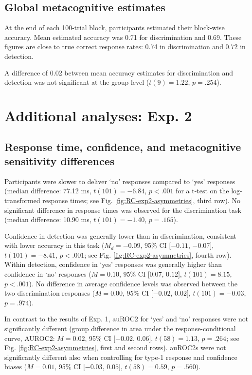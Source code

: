 \documentclass[12pt,twoside]{reedthesis}
\begin{document}
\hypertarget{global-metacognitive-estimates}{%
\subsection{Global metacognitive estimates}\label{global-metacognitive-estimates}}

At the end of each 100-trial block, participants estimated their block-wise accuracy. Mean estimated accuracy was 0.71 for discrimination and 0.69. These figures are close to true correct response rates: 0.74 in discrimination and 0.72 in detection.

A difference of 0.02 between mean accuracy estimates for discrimination and detection was not significant at the group level (\(t(9) = 1.22\), \(p = .254\)).

\hypertarget{additional-analyses-exp.-2}{%
\section{Additional analyses: Exp. 2}\label{additional-analyses-exp.-2}}

\hypertarget{appRC:asymmetries2}{%
\subsection{Response time, confidence, and metacognitive sensitivity differences}\label{appRC:asymmetries2}}

Participants were slower to deliver `no' responses compared to `yes' responses (median difference: 77.12 ms, \(t(101) = -6.84\), \(p < .001\) for a t-test on the log-transformed response times; see Fig. \ref{fig:RC-exp2-asymmetries}, third row). No significant difference in response times was observed for the discrimination task (median difference: 10.90 ms, \(t(101) = -1.40\), \(p = .165\)).

Confidence in detection was generally lower than in discrimination, consistent with lower accuracy in this task (\(M_d = -0.09\), 95\% CI \([-0.11\), \(-0.07]\), \(t(101) = -8.41\), \(p < .001\); see Fig. \ref{fig:RC-exp2-asymmetries}, fourth row). Within detection, confidence in `yes' responses was generally higher than confidence in `no' responses (\(M = 0.10\), 95\% CI \([0.07\), \(0.12]\), \(t(101) = 8.15\), \(p < .001\)). No difference in average confidence levels was observed between the two discrimination responses (\(M = 0.00\), 95\% CI \([-0.02\), \(0.02]\), \(t(101) = -0.03\), \(p = .974\)).

In contrast to the results of Exp. 1, auROC2 for `yes' and `no' responses were not significantly different (group difference in area under the response-conditional curve, AUROC2: \(M = 0.02\), 95\% CI \([-0.02\), \(0.06]\), \(t(58) = 1.13\), \(p = .264\); see Fig. \ref{fig:RC-exp2-asymmetries}, first and second rows). auROC2s were not significantly different also when controlling for type-1 response and confidence biases (\(M = 0.01\), 95\% CI \([-0.03\), \(0.05]\), \(t(58) = 0.59\), \(p = .560\)).
\end{document}
